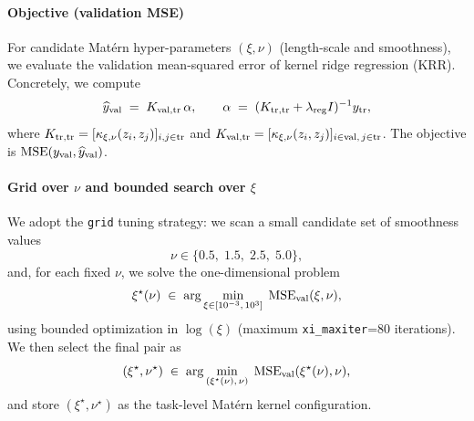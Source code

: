 \paragraph{Objective (validation MSE)}
For candidate Matérn hyper-parameters $(\xi,\nu)$ (length-scale and smoothness), we evaluate
the validation mean-squared error of kernel ridge regression (KRR). Concretely, we compute
\[
\widehat{y}_{\rm val}
\;=\;
K_{\rm val, tr}\,\alpha,
\qquad
\alpha \;=\; (K_{\rm tr,tr} + \lambda_{\rm reg} I)^{-1}y_{\rm tr},
\]
where $K_{\rm tr,tr} = [\kappa_{\xi,\nu}(z_i,z_j)]_{i,j\in \text{tr}}$ and
$K_{\rm val,tr} = [\kappa_{\xi,\nu}(z_i,z_j)]_{i\in\text{val},\,j\in\text{tr}}$.
The objective is $\mathrm{MSE}(y_{\rm val},\widehat{y}_{\rm val})$.

\paragraph{Grid over $\nu$ and bounded search over $\xi$}
We adopt the \texttt{grid} tuning strategy: we scan a small candidate set of smoothness values
\[
\nu \in \{0.5,\;1.5,\;2.5,\;5.0\},
\]
and, for each fixed $\nu$, we solve the one-dimensional problem
\[
\xi^\star(\nu)\; \in\; \arg\min_{\xi\in[10^{-3},\,10^{3}]}\; \mathrm{MSE}_{\rm val}(\xi,\nu),
\]
using bounded optimization in $\log(\xi)$ (maximum \texttt{xi\_maxiter}=80 iterations).
We then select the final pair as
\[
(\xi^\star,\nu^\star)\;\in\;\arg\min_{(\xi^\star(\nu),\,\nu)}\;\mathrm{MSE}_{\rm val}(\xi^\star(\nu),\nu),
\]
and store $(\xi^\star,\nu^\star)$ as the task-level Matérn kernel configuration.
